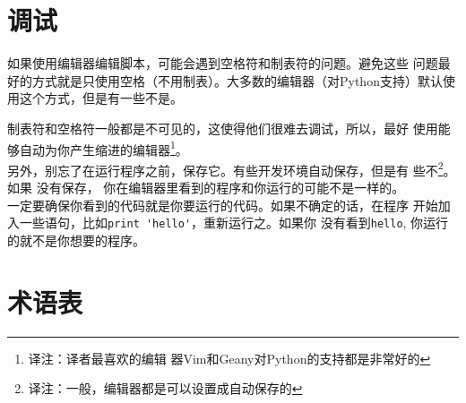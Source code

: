 \section{调试}
\label{editor}


如果使用编辑器编辑脚本，可能会遇到空格符和制表符的问题。避免这些
问题最好的方式就是只使用空格（不用制表）。大多数的编辑器（对Python支持）默认使用这个方式，但是有一些不是。


制表符和空格符一般都是不可见的，这使得他们很难去调试，所以，最好
使用能够自动为你产生缩进的编辑器\footnote{译注：译者最喜欢的编辑
器Vim和Geany对Python的支持都是非常好的}。\\

另外，别忘了在运行程序之前，保存它。有些开发环境自动保存，但是有
些不\footnote{译注：一般，编辑器都是可以设置成自动保存的}。如果
没有保存， 你在编辑器里看到的程序和你运行的可能不是一样的。\\

一定要确保你看到的代码就是你要运行的代码。如果不确定的话，在程序
开始加入一些语句，比如\verb"print 'hello'"，重新运行之。如果你
没有看到\verb"hello", 你运行的就不是你想要的程序。


\section{术语表}

